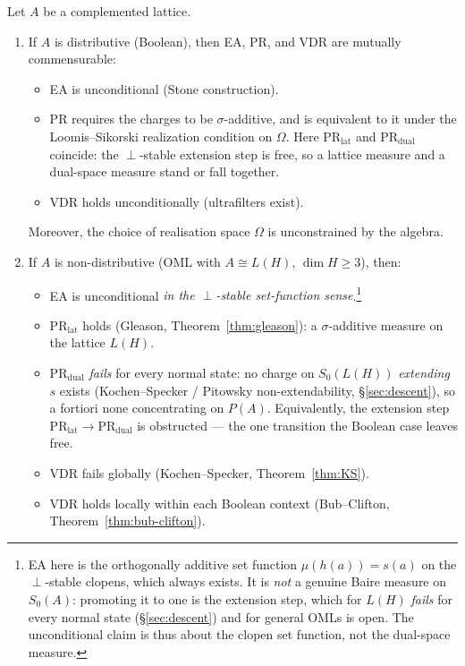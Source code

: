 \begin{theorem}[Commensurability]
\label{thm:commensurability}
Let $A$ be a complemented lattice.
\begin{enumerate}[label=(\alph*)]
  \item If $A$ is distributive \textup{(}Boolean\textup{)}, then
    EA, PR, and VDR are mutually commensurable:
    \begin{itemize}
      \item EA is unconditional
        \textup{(}Stone construction\textup{)}.
      \item PR requires the charges to be $\sigma$-additive, and is
        equivalent to it under the Loomis--Sikorski realization
        condition on $\Omega$.  Here
        $\text{PR}_{\text{lat}}$ and $\text{PR}_{\text{dual}}$ coincide:
        the $\perp$-stable extension step is free, so a lattice measure
        and a dual-space measure stand or fall together.
      \item VDR holds unconditionally
        \textup{(}ultrafilters exist\textup{)}.
    \end{itemize}
    Moreover, the choice of realisation space $\Omega$ is
    unconstrained by the algebra.

  \item If $A$ is non-distributive \textup{(}OML with
    $A \cong L(H)$, $\dim H \geq 3$\textup{)}, then:
    \begin{itemize}
      \item EA is unconditional \emph{in the $\perp$-stable set-function
        sense}.\footnote{EA here is the orthogonally additive set
        function $\mu(h(a)) = s(a)$ on the $\perp$-stable clopens, which
        always exists.  It is \emph{not} a genuine Baire measure on
        $S_0(A)$: promoting it to one is the extension step, which for
        $L(H)$ \emph{fails} for every normal state
        (\S\ref{sec:descent}) and for general OMLs is open.  The unconditional
        claim is thus about the clopen set function, not the dual-space
        measure.}
      \item $\text{PR}_{\text{lat}}$ holds \textup{(}Gleason,
        Theorem~\textup{\ref{thm:gleason})}: a $\sigma$-additive measure
        on the lattice $L(H)$.
      \item $\text{PR}_{\text{dual}}$ \emph{fails} for every normal
        state: no charge on $S_0(L(H))$ \emph{extending $s$} exists
        (Kochen--Specker / Pitowsky non-extendability,
        \S\ref{sec:descent}), so a fortiori none concentrating on
        $P(A)$.  Equivalently,
        the extension step $\text{PR}_{\text{lat}} \to
        \text{PR}_{\text{dual}}$ is obstructed --- the one transition the
        Boolean case leaves free.
      \item VDR fails globally
        \textup{(}Kochen--Specker,
        Theorem~\textup{\ref{thm:KS})}.
      \item VDR holds locally within each Boolean context
        \textup{(}Bub--Clifton,
        Theorem~\textup{\ref{thm:bub-clifton})}.
    \end{itemize}
\end{enumerate}
\end{theorem}

